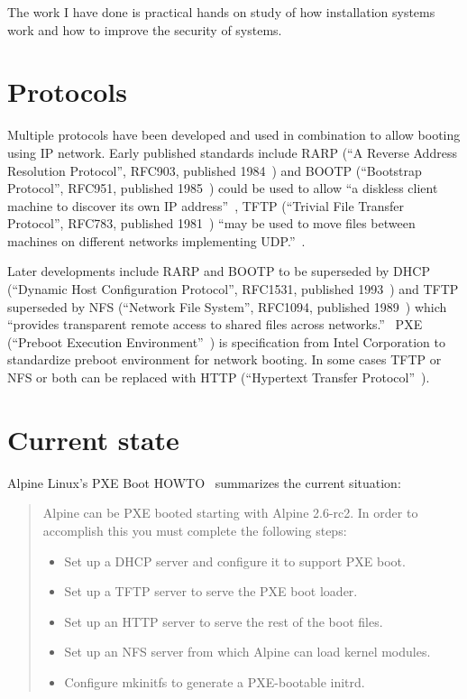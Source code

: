 The work I have done is practical hands on study of how installation
systems work and how to improve the security of systems.

\section{Protocols}

Multiple protocols have been developed and used in combination to
allow booting using IP network. Early published standards include RARP
(``A Reverse Address Resolution Protocol'', RFC903, published
1984~\cite{RFC903}) and BOOTP (``Bootstrap Protocol'', RFC951,
published 1985~\cite{RFC951}) could be used to allow ``a diskless
client machine to discover its own IP address''~\cite{RFC951}, TFTP
(``Trivial File Transfer Protocol'', RFC783, published
1981~\cite{RFC783}) ``may be used to move files between machines on
different networks implementing UDP.''~\cite{RFC783}.

Later developments include RARP and BOOTP to be superseded by DHCP
(``Dynamic Host Configuration Protocol'', RFC1531, published
1993~\cite{RFC1531}) and TFTP superseded by NFS (``Network File
System'', RFC1094, published 1989~\cite{RFC1094}) which ``provides
transparent remote access to shared files across
networks.''~\cite{RFC1094} PXE (``Preboot Execution
Environment''~\cite{PXEspec}) is specification from Intel Corporation
to standardize preboot environment for network booting. In some cases
TFTP or NFS or both can be replaced with HTTP (``Hypertext Transfer
Protocol''~\cite{RFC1945}\cite{RFC2616}).


\section{Current state}

Alpine Linux's PXE Boot HOWTO~\cite{alpine-pxe-boot-howto} summarizes
the current situation:

\begin{quote}
Alpine can be PXE booted starting with Alpine 2.6-rc2. In order to
accomplish this you must complete the following steps:

\begin{itemize}
\item Set up a DHCP server and configure it to support PXE boot.
\item Set up a TFTP server to serve the PXE boot loader.
\item Set up an HTTP server to serve the rest of the boot files.
\item Set up an NFS server from which Alpine can load kernel modules.
\item Configure mkinitfs to generate a PXE-bootable initrd.
\end{itemize}
\end{quote}

